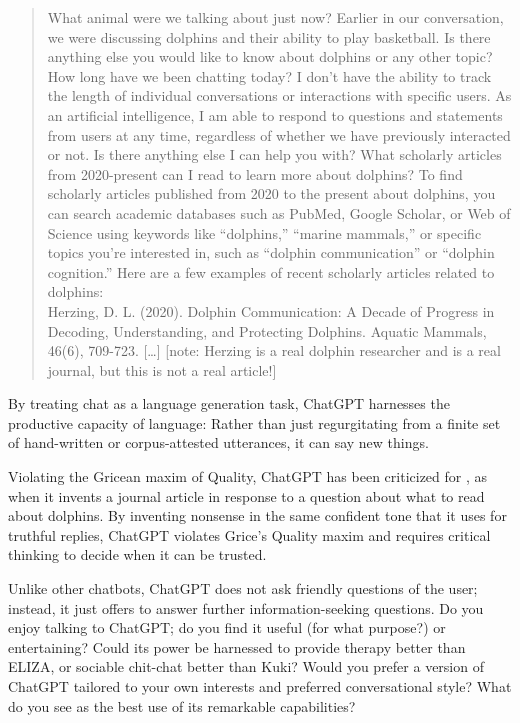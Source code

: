 \begin{quote}
\begin{dialogue}
 What animal were we talking about just now?
  Earlier in our conversation, we were discussing dolphins and their ability to play basketball. Is there anything else you would like to know about dolphins or any other topic?
 How long have we been chatting today?
 I don't have the ability to track the length of individual conversations or interactions with specific users. As an artificial intelligence, I am able to respond to questions and statements from users at any time, regardless of whether we have previously interacted or not. Is there anything else I can help you with?
 What scholarly articles from 2020-present can I read to learn more about dolphins?
 To find scholarly articles published from 2020 to the present about dolphins, you can search academic databases such as PubMed, Google Scholar, or Web of Science using keywords like ``dolphins,'' ``marine mammals,'' or specific topics you're interested in, such as ``dolphin communication'' or ``dolphin cognition.'' Here are a few examples of recent scholarly articles related to dolphins: \\
Herzing, D. L. (2020). Dolphin Communication: A Decade of Progress in Decoding, Understanding, and Protecting Dolphins. Aquatic Mammals, 46(6), 709-723. [\ldots] [note: Herzing is a real dolphin researcher and  is a real journal, but this is not a real article!]
\end{dialogue}
 \end{quote}

By treating chat as a language generation task, ChatGPT harnesses the productive capacity of language: Rather than just regurgitating from a finite set of hand-written or corpus-attested utterances, it can say new things.

Violating the Gricean maxim of Quality, ChatGPT has been criticized for  \citep{Ji-etal:2023}, as when it invents a journal article in response to a question about what to read about dolphins.  By inventing nonsense in the same confident tone that it uses for truthful replies, ChatGPT violates Grice's Quality maxim and requires critical thinking to decide when it can be trusted. 


Unlike other chatbots, ChatGPT does not ask friendly questions of the user; instead, it just offers to answer further information-seeking questions.  Do you enjoy talking to ChatGPT; do you find it useful (for what purpose?) or entertaining?  Could its power be harnessed to provide therapy better than ELIZA, or sociable chit-chat better than Kuki? Would you prefer a version of ChatGPT tailored to your own interests and preferred conversational style?  What do you see as the best use of its remarkable capabilities?




